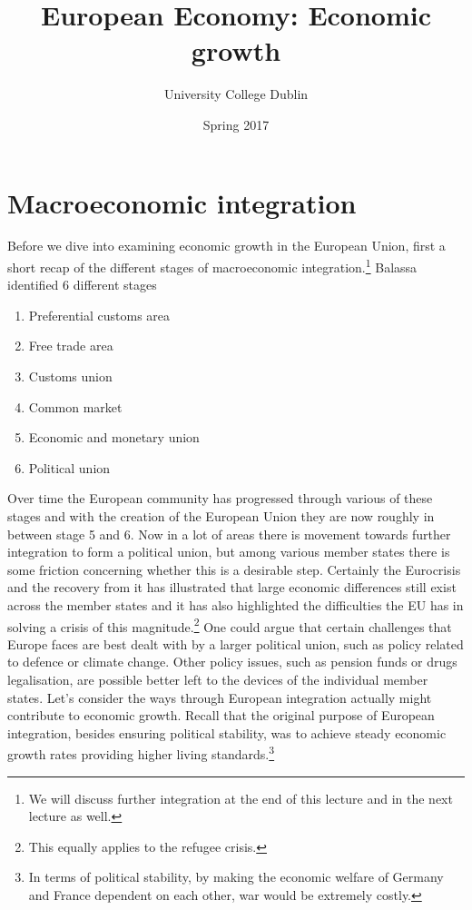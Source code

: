 \documentclass{tufte-handout}
\title{European Economy: Economic growth}
\author{University College Dublin}
\date{Spring 2017}
\begin{document}
\maketitle  
\section{Macroeconomic integration}
Before we dive into examining economic growth in the European Union, first a short recap of the different stages of macroeconomic integration.\footnote{We will discuss further integration at the end of this lecture and in the next lecture as well.}
Balassa identified 6 different stages
\begin{enumerate}
  \item Preferential customs area
  \item Free trade area
  \item Customs union
  \item Common market
  \item Economic and monetary union
  \item Political union
\end{enumerate}
Over time the European community has progressed through various of these stages and with the creation of the European Union they are now roughly in between stage 5 and 6. 
Now in a lot of areas there is movement towards further integration to form a political union, but among various member states there is some friction concerning whether this is a desirable step. 
Certainly the Eurocrisis and the recovery from it has illustrated that large economic differences still exist across the member states and it has also highlighted the difficulties the EU has in solving a crisis of this magnitude.\footnote{This equally applies to the refugee crisis.}
One could argue that certain challenges that Europe faces are best dealt with by a larger political union, such as policy related to defence or climate change. Other policy issues, such as pension funds or drugs legalisation, are possible better left to the devices of the individual member states.
Let's consider the ways through European integration actually might contribute to economic growth. 
Recall that the original purpose of European integration, besides ensuring political stability, was to achieve steady economic growth rates providing higher living standards.\footnote{In terms of political stability, by making the economic welfare of Germany and France dependent on each other, war would be extremely costly.} 
\clearpage
\end{document}
